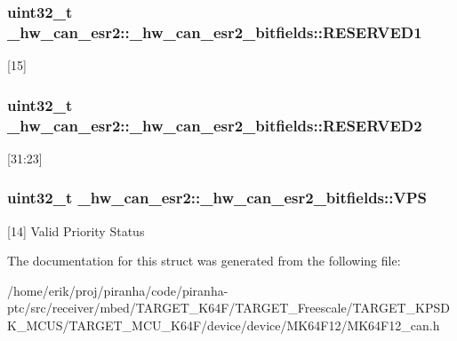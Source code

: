 \subsubsection[{\texorpdfstring{R\+E\+S\+E\+R\+V\+E\+D1}{RESERVED1}}]{\setlength{\rightskip}{0pt plus 5cm}uint32\+\_\+t \+\_\+hw\+\_\+can\+\_\+esr2\+::\+\_\+hw\+\_\+can\+\_\+esr2\+\_\+bitfields\+::\+R\+E\+S\+E\+R\+V\+E\+D1}\hypertarget{struct__hw__can__esr2_1_1__hw__can__esr2__bitfields_a915d205d6d60f2305845046b95fe1f60}{}\label{struct__hw__can__esr2_1_1__hw__can__esr2__bitfields_a915d205d6d60f2305845046b95fe1f60}
\mbox{[}15\mbox{]} 
\subsubsection[{\texorpdfstring{R\+E\+S\+E\+R\+V\+E\+D2}{RESERVED2}}]{\setlength{\rightskip}{0pt plus 5cm}uint32\+\_\+t \+\_\+hw\+\_\+can\+\_\+esr2\+::\+\_\+hw\+\_\+can\+\_\+esr2\+\_\+bitfields\+::\+R\+E\+S\+E\+R\+V\+E\+D2}\hypertarget{struct__hw__can__esr2_1_1__hw__can__esr2__bitfields_ae436f020c6728eafe23c59a92f0869e2}{}\label{struct__hw__can__esr2_1_1__hw__can__esr2__bitfields_ae436f020c6728eafe23c59a92f0869e2}
\mbox{[}31\+:23\mbox{]} 
\subsubsection[{\texorpdfstring{V\+PS}{VPS}}]{\setlength{\rightskip}{0pt plus 5cm}uint32\+\_\+t \+\_\+hw\+\_\+can\+\_\+esr2\+::\+\_\+hw\+\_\+can\+\_\+esr2\+\_\+bitfields\+::\+V\+PS}\hypertarget{struct__hw__can__esr2_1_1__hw__can__esr2__bitfields_ae7b53c722f5e368123bec5dc4db08ef4}{}\label{struct__hw__can__esr2_1_1__hw__can__esr2__bitfields_ae7b53c722f5e368123bec5dc4db08ef4}
\mbox{[}14\mbox{]} Valid Priority Status 

The documentation for this struct was generated from the following file\+:\begin{DoxyCompactItemize}
\item 
/home/erik/proj/piranha/code/piranha-\/ptc/src/receiver/mbed/\+T\+A\+R\+G\+E\+T\+\_\+\+K64\+F/\+T\+A\+R\+G\+E\+T\+\_\+\+Freescale/\+T\+A\+R\+G\+E\+T\+\_\+\+K\+P\+S\+D\+K\+\_\+\+M\+C\+U\+S/\+T\+A\+R\+G\+E\+T\+\_\+\+M\+C\+U\+\_\+\+K64\+F/device/device/\+M\+K64\+F12/M\+K64\+F12\+\_\+can.\+h\end{DoxyCompactItemize}
